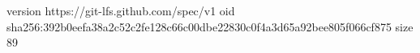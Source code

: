 version https://git-lfs.github.com/spec/v1
oid sha256:392b0eefa38a2c52c2fe128c66c00dbe22830c0f4a3d65a92bee805f066cf875
size 89
